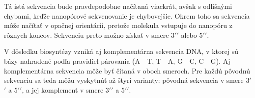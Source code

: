 Tá istá sekvencia bude pravdepodobne načítaná viackrát, avšak s odlišnými chybami, keďže nanopórové sekvenovanie je chybovejšie.
Okrem toho sa sekvencia môže načítať v opačnej orientácii, pretože molekula vstupuje do nanopóru z rôznych koncov.
Sekvenciu preto možno získať v smere 3$'$$'$ alebo 5$'$$'$.

V dôsledku biosyntézy vzniká aj komplementárna sekvencia DNA, v ktorej sú bázy nahradené podľa pravidiel párovania (A~\textrightarrow~T, T~\textrightarrow~A, G~\textrightarrow~C, C~\textrightarrow~G).
Aj komplementárna sekvencia môže byť čítaná v oboch smeroch.
Pre každú pôvodnú sekvenciu sa teda môžu vyskytnúť až štyri varianty: pôvodná sekvencia v smere 3$'$$'$ a 5$'$$'$, a jej komplement v smere 3$'$$'$ a 5$'$$'$.
